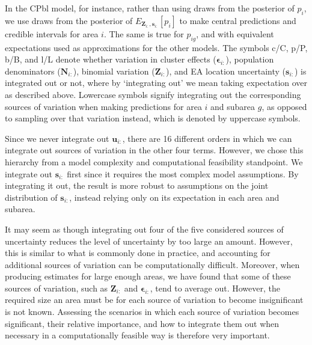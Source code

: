 \documentclass[12pt]{article}
\begin{document}
In the CPbl model, for instance, rather than using draws from the posterior of $p_i$, we use draws from the posterior of $E_{\boldsymbol{Z}_{i:},\boldsymbol{s}_{i:}}  \left [ p_{i} \right ]$ to make central predictions and credible intervals for area $i$. The same is true for $p_{ig}$, and with equivalent expectations used as approximations for the other models. The symbols c/C, p/P, b/B, and l/L denote whether variation in cluster effects ($\boldsymbol{ \epsilon }_{i:}$), population denominators ($\boldsymbol{N}_{i:}$), binomial variation ($\boldsymbol{Z}_{i:}$), and EA location uncertainty ($\boldsymbol{s}_{i:}$) is integrated out or not, where by `integrating out' we mean taking expectation over as described above. Lowercase symbols signify integrating out the corresponding sources of variation when making predictions for area $i$ and subarea $g$, as opposed to sampling over that variation instead, which is denoted by uppercase symbols.

Since we never integrate out $\boldsymbol{u}_{i:}$, there are 16 different orders in which we can integrate out sources of variation in the other four terms. However, we chose this hierarchy from a model complexity and computational feasibility standpoint. We integrate out $\boldsymbol{s}_{i:}$ first since it requires the most complex model assumptions. By integrating it out, the result is more robust to assumptions on the joint distribution of $\boldsymbol{s}_{i:}$, instead relying only on its expectation in each area and subarea.

It may seem as though integrating out four of the five considered sources of uncertainty reduces the level of uncertainty by too large an amount. However, this is similar to what is commonly done in practice, and accounting for additional sources of variation can be computationally difficult.  Moreover, when producing estimates for large enough areas, we have found that some of these sources of variation, such as $\boldsymbol{Z}_{i:}$ and $\boldsymbol{ \epsilon}_{i:}$, tend to average out.  However, the required size an area must be for each source of variation to become insignificant is not known.  Assessing the scenarios in which each source of variation becomes significant, their relative importance, and how to integrate them out when necessary in a computationally feasible way is therefore very important.
\end{document}
